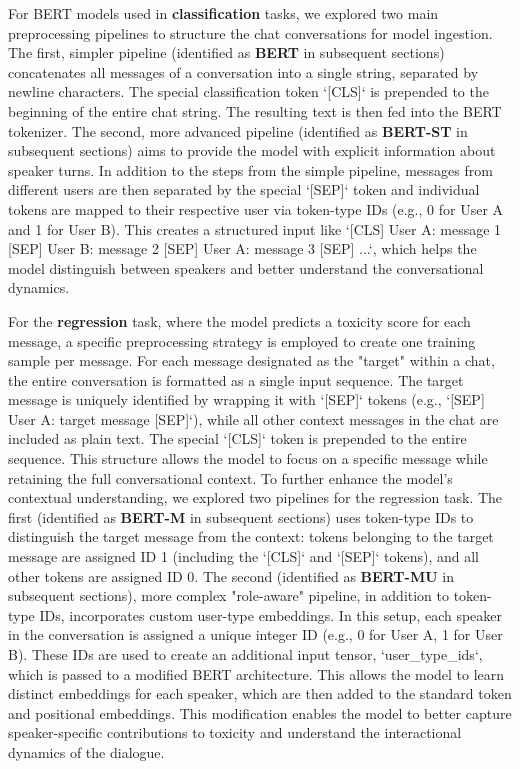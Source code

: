\documentclass[twocolumn]{ceurart}
\begin{document}
For BERT models used in \textbf{classification} tasks, we explored two main preprocessing pipelines to structure the chat conversations for model ingestion. The first, simpler pipeline (identified as \textbf{BERT} in subsequent sections) concatenates all messages of a conversation into a single string, separated by newline characters. The special classification token `[CLS]` is prepended to the beginning of the entire chat string. The resulting text is then fed into the BERT tokenizer. The second, more advanced pipeline (identified as \textbf{BERT-ST} in subsequent sections) aims to provide the model with explicit information about speaker turns. In addition to the steps from the simple pipeline, messages from different users are then separated by the special `[SEP]` token and individual tokens are mapped to their respective user via token-type IDs (e.g., 0 for User A and 1 for User B). This creates a structured input like `[CLS] User A: message 1 [SEP] User B: message 2 [SEP] User A: message 3 [SEP] ...`, which helps the model distinguish between speakers and better understand the conversational dynamics.

For the \textbf{regression} task, where the model predicts a toxicity score for each message, a specific preprocessing strategy is employed to create one training sample per message. For each message designated as the "target" within a chat, the entire conversation is formatted as a single input sequence. The target message is uniquely identified by wrapping it with `[SEP]` tokens (e.g., `[SEP] User A: target message [SEP]`), while all other context messages in the chat are included as plain text. The special `[CLS]` token is prepended to the entire sequence. This structure allows the model to focus on a specific message while retaining the full conversational context. To further enhance the model's contextual understanding, we explored two pipelines for the regression task. The first (identified as \textbf{BERT-M} in subsequent sections) uses token-type IDs to distinguish the target message from the context: tokens belonging to the target message are assigned ID 1 (including the `[CLS]` and `[SEP]` tokens), and all other tokens are assigned ID 0. The second (identified as \textbf{BERT-MU} in subsequent sections), more complex "role-aware" pipeline, in addition to token-type IDs, incorporates custom user-type embeddings. In this setup, each speaker in the conversation is assigned a unique integer ID (e.g., 0 for User A, 1 for User B). These IDs are used to create an additional input tensor, `user\_type\_ids`, which is passed to a modified BERT architecture. This allows the model to learn distinct embeddings for each speaker, which are then added to the standard token and positional embeddings. This modification enables the model to better capture speaker-specific contributions to toxicity and understand the interactional dynamics of the dialogue.
\end{document}
